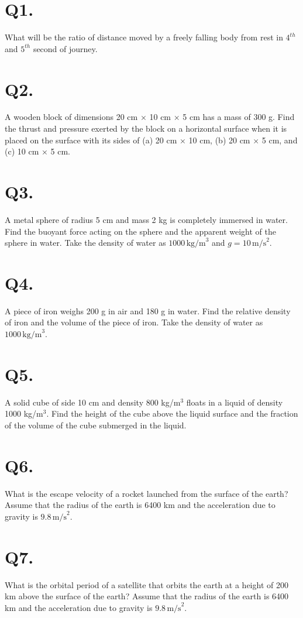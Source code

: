 \documentclass{article}
\begin{document}
\section*{Q1.}
What will be the ratio of distance moved by a freely falling body from rest in $4^{th}$ and $5^{th}$ second of journey.
    
\section*{Q2.}
A wooden block of dimensions 20 cm $\times$ 10 cm $\times$ 5 cm has a mass of 300 g. Find the thrust and pressure exerted by the block on a horizontal surface when it is placed on the surface with its sides of (a) 20 cm $\times$ 10 cm, (b) 20 cm $\times$ 5 cm, and (c) 10 cm $\times$ 5 cm.

\section*{Q3.}
A metal sphere of radius 5 cm and mass 2 kg is completely immersed in water. Find the buoyant force acting on the sphere and the apparent weight of the sphere in water. Take the density of water as $1000 \, \text{kg/m}^3$ and $g = 10 \, \text{m/s}^2$.

\section*{Q4.}
A piece of iron weighs 200 g in air and 180 g in water. Find the relative density of iron and the volume of the piece of iron. Take the density of water as $1000 \, \text{kg/m}^3$.

\section*{Q5.}
A solid cube of side 10 cm and density 800 kg/m\(^3\) floats in a liquid of density 1000 kg/m\(^3\). Find the height of the cube above the liquid surface and the fraction of the volume of the cube submerged in the liquid.

\section*{Q6.}
What is the escape velocity of a rocket launched from the surface of the earth? Assume that the radius of the earth is 6400 km and the acceleration due to gravity is $9.8 \, \text{m/s}^2$.

\section*{Q7.}
What is the orbital period of a satellite that orbits the earth at a height of 200 km above the surface of the earth? Assume that the radius of the earth is 6400 km and the acceleration due to gravity is $9.8 \, \text{m/s}^2$.
\end{document}
